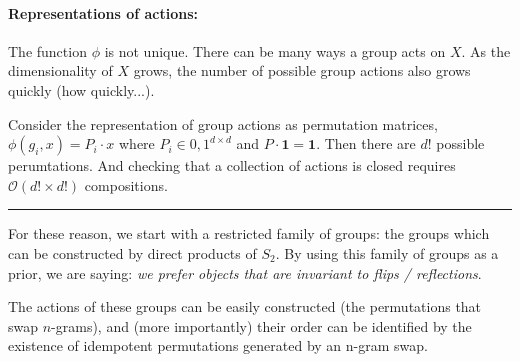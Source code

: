 

\paragraph{Representations of actions:} The function $\phi$ is not unique. There can be many ways
a group acts on $X$. As the dimensionality of $X$ grows, the number of possible group actions also grows quickly {\color{red}(how quickly...)}.


Consider the representation of group actions as permutation matrices, $\phi(g_i, x) = P_i \cdot x$ where $P_i \in {0, 1}^{d\times d}$ and $P \cdot \mathbf 1 = \mathbf 1$.
Then there are $d!$ possible perumtations.
 And checking that a collection of actions is closed requires $\mathcal O(d! \times d!)$ compositions.\footnotemark[39]



\begin{center}\rule{0.5\linewidth}{\linethickness}\end{center}

For these reason, we start with a restricted family of groups:
the groups which can be constructed by direct products of $S_2$.
By using this family of groups as a prior, we are saying: \textit{we prefer objects that are invariant to flips / reflections}.

The actions of these groups can be easily constructed (the permutations that swap $n$-grams\footnotemark[43]), and (more importantly)
their order can be identified by the existence of idempotent permutations generated by an n-gram swap.


